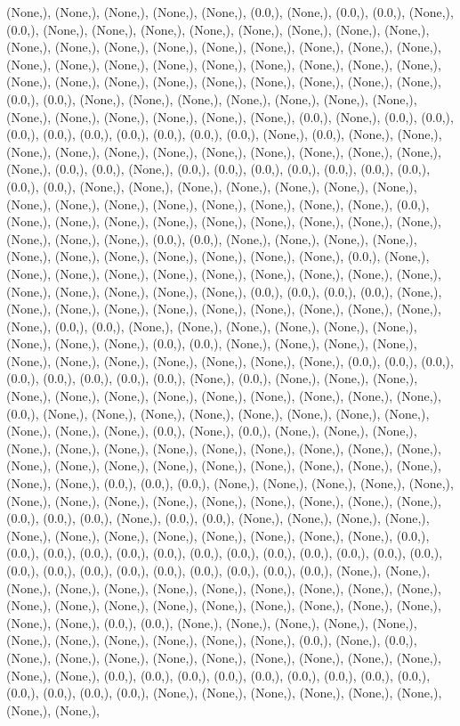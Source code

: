 \documentclass{article}
\begin{document}
(None,), (None,), (None,), (None,), (None,), (0.0,), (None,), (0.0,), (0.0,), (None,), (0.0,), (None,), (None,), (None,), (None,), (None,), (None,), (None,), (None,), (None,), (None,), (None,), (None,), (None,), (None,), (None,), (None,), (None,), (None,), (None,), (None,), (None,), (None,), (None,), (None,), (None,), (None,), (None,), (None,), (None,), (None,), (None,), (None,), (None,), (None,), (None,), (0.0,), (0.0,), (None,), (None,), (None,), (None,), (None,), (None,), (None,), (None,), (None,), (None,), (None,), (None,), (None,), (0.0,), (None,), (0.0,), (0.0,), (0.0,), (0.0,), (0.0,), (0.0,), (0.0,), (0.0,), (0.0,), (None,), (0.0,), (None,), (None,), (None,), (None,), (None,), (None,), (None,), (None,), (None,), (None,), (None,), (None,), (0.0,), (0.0,), (None,), (0.0,), (0.0,), (0.0,), (0.0,), (0.0,), (0.0,), (0.0,), (0.0,), (0.0,), (None,), (None,), (None,), (None,), (None,), (None,), (None,), (None,), (None,), (None,), (None,), (None,), (None,), (None,), (None,), (0.0,), (None,), (None,), (None,), (None,), (None,), (None,), (None,), (None,), (None,), (None,), (None,), (None,), (0.0,), (0.0,), (None,), (None,), (None,), (None,), (None,), (None,), (None,), (None,), (None,), (None,), (None,), (0.0,), (None,), (None,), (None,), (None,), (None,), (None,), (None,), (None,), (None,), (None,), (None,), (None,), (None,), (None,), (None,), (0.0,), (0.0,), (0.0,), (0.0,), (None,), (None,), (None,), (None,), (None,), (None,), (None,), (None,), (None,), (None,), (None,), (0.0,), (0.0,), (None,), (None,), (None,), (None,), (None,), (None,), (None,), (None,), (None,), (0.0,), (0.0,), (None,), (None,), (None,), (None,), (None,), (None,), (None,), (None,), (None,), (None,), (None,), (0.0,), (0.0,), (0.0,), (0.0,), (0.0,), (0.0,), (0.0,), (0.0,), (None,), (0.0,), (None,), (None,), (None,), (None,), (None,), (None,), (None,), (None,), (None,), (None,), (None,), (None,), (0.0,), (None,), (None,), (None,), (None,), (None,), (None,), (None,), (None,), (None,), (None,), (None,), (0.0,), (None,), (0.0,), (None,), (None,), (None,), (None,), (None,), (None,), (None,), (None,), (None,), (None,), (None,), (None,), (None,), (None,), (None,), (None,), (None,), (None,), (None,), (None,), (None,), (None,), (None,), (0.0,), (0.0,), (0.0,), (None,), (None,), (None,), (None,), (None,), (None,), (None,), (None,), (None,), (None,), (None,), (None,), (None,), (None,), (0.0,), (0.0,), (0.0,), (None,), (0.0,), (0.0,), (None,), (None,), (None,), (None,), (None,), (None,), (None,), (None,), (None,), (None,), (None,), (None,), (0.0,), (0.0,), (0.0,), (0.0,), (0.0,), (0.0,), (0.0,), (0.0,), (0.0,), (0.0,), (0.0,), (0.0,), (0.0,), (0.0,), (0.0,), (0.0,), (0.0,), (0.0,), (0.0,), (0.0,), (0.0,), (0.0,), (None,), (None,), (None,), (None,), (None,), (None,), (None,), (None,), (None,), (None,), (None,), (None,), (None,), (None,), (None,), (None,), (None,), (None,), (None,), (None,), (None,), (None,), (0.0,), (0.0,), (None,), (None,), (None,), (None,), (None,), (None,), (None,), (None,), (None,), (None,), (None,), (0.0,), (None,), (0.0,), (None,), (None,), (None,), (None,), (None,), (None,), (None,), (None,), (None,), (None,), (None,), (0.0,), (0.0,), (0.0,), (0.0,), (0.0,), (0.0,), (0.0,), (0.0,), (0.0,), (0.0,), (0.0,), (0.0,), (0.0,), (None,), (None,), (None,), (None,), (None,), (None,), (None,), (None,), 
\end{document}

